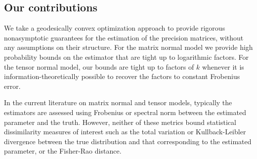 \documentclass[aos]{imsart}
\theoremstyle{definition}
\numberwithin{equation}{section}
\begin{document}
\subsection{Our contributions}
We take a geodesically convex optimization approach to provide rigorous nonasymptotic guarantees for the estimation of the precision matrices, without any assumptions on their structure. For the matrix normal model we provide high probability bounds on the estimator that are tight up to logarithmic factors. For the tensor normal model, our bounds are tight up to factors of $k$ whenever it is information-theoretically possible to recover the factors to constant Frobenius error.


In the current literature on matrix normal and tensor models, typically the estimators are assessed using Frobenius or spectral norm between the estimated parameter and the truth.
However, neither of these metrics bound statistical dissimilarity measures of interest such as the total variation or Kullback-Leibler divergence between the true distribution and that corresponding to the estimated parameter, or the Fisher-Rao distance.
\end{document}

